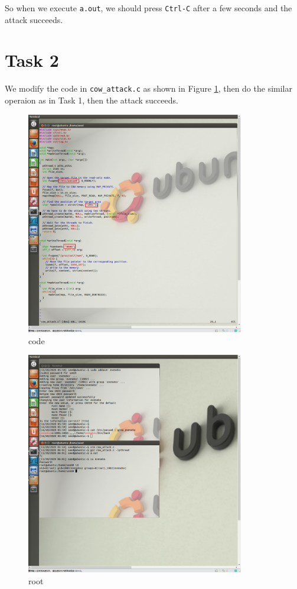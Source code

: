 \documentclass[onecolumn,oneside]{SUSTechHomework}
\begin{document}
    So when we execute \texttt{a.out}, we should press \texttt{Ctrl-C} after a few seconds and the attack succeeds.

  \section*{Task 2}

  We modify the code in \texttt{cow\_attack.c} as shown in Figure \ref{fig:code}, then do the similar operaion as in Task 1, then the attack succeeds.

    \begin{figure}[H]
      \centering
      \includegraphics[width=0.85\textwidth]{img/pic3.png}
      \caption{code}
      \label{fig:code}
    \end{figure}

    \begin{figure}[H]
      \centering
      \includegraphics[width=0.85\textwidth]{img/pic2.png}
      \caption{root}
    \end{figure}
\end{document}
